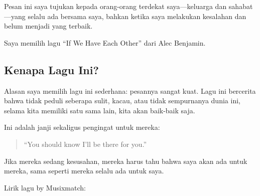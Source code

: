 \documentclass[
  letterpaper,
  DIV=11,
  numbers=noendperiod]{scrreprt}
\begin{document}
Pesan ini saya tujukan kepada orang-orang terdekat saya---keluarga dan
sahabat---yang selalu ada bersama saya, bahkan ketika saya melakukan
kesalahan dan belum menjadi yang terbaik.

Saya memilih lagu ``If We Have Each Other'' dari Alec Benjamin.

\subsection{Kenapa Lagu Ini?}\label{kenapa-lagu-ini}

Alasan saya memilih lagu ini sederhana: pesannya sangat kuat. Lagu ini
bercerita bahwa tidak peduli seberapa sulit, kacau, atau tidak
sempurnanya dunia ini, selama kita memiliki satu sama lain, kita akan
baik-baik saja.

Ini adalah janji sekaligus pengingat untuk mereka:

\begin{quote}
``You should know I'll be there for you.''
\end{quote}

Jika mereka sedang kesusahan, mereka harus tahu bahwa saya akan ada
untuk mereka, sama seperti mereka selalu ada untuk saya.

Lirik lagu by Musixmatch:
\end{document}
